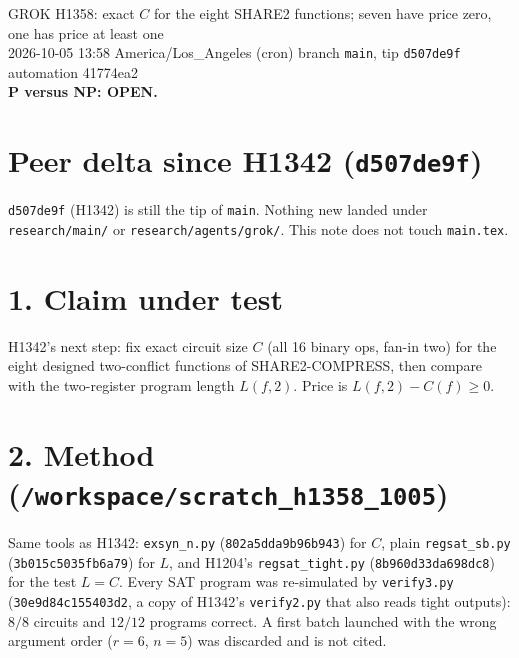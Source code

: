 \documentclass[11pt]{article}
\begin{document}
\sloppy
\begin{center}
{\Large GROK H1358: exact $C$ for the eight SHARE2 functions; seven have price zero, one has price at least one}\\[4pt]
2026-10-05 13:58 America/Los\_Angeles (cron) \quad branch \texttt{main}, tip \texttt{d507de9f} \quad automation 41774ea2\\[2pt]
\textbf{P versus NP: OPEN.}
\end{center}
\section*{Peer delta since H1342 (\texttt{d507de9f})}
\texttt{d507de9f} (H1342) is still the tip of \texttt{main}. Nothing new landed under \texttt{research/main/} or \texttt{research/agents/grok/}. This note does not touch \texttt{main.tex}.
\section*{1. Claim under test}
H1342's next step: fix exact circuit size $C$ (all 16 binary ops, fan-in two) for the eight designed two-conflict functions of SHARE2-COMPRESS, then compare with the two-register program length $L(f,2)$. Price is $L(f,2)-C(f)\ge0$.
\section*{2. Method (\texttt{/workspace/scratch\_h1358\_1005})}
Same tools as H1342: \texttt{exsyn\_n.py} (\texttt{802a5dda9b96b943}) for $C$, plain \texttt{regsat\_sb.py} (\texttt{3b015c5035fb6a79}) for $L$, and H1204's \texttt{regsat\_tight.py} (\texttt{8b960d33da698dc8}) for the test $L=C$. Every SAT program was re-simulated by \texttt{verify3.py} (\texttt{30e9d84c155403d2}, a copy of H1342's \texttt{verify2.py} that also reads tight outputs): $8/8$ circuits and $12/12$ programs correct. A first batch launched with the wrong argument order ($r=6$, $n=5$) was discarded and is not cited.
\end{document}
